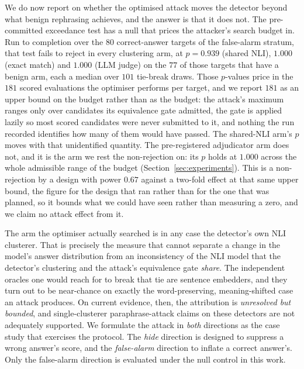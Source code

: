 We do now report on whether the optimised attack moves the detector beyond what benign
rephrasing achieves, and the answer is that it does not. The pre-committed exceedance test
has a null that prices the attacker's search budget in. Run to
completion over the $80$ correct-answer targets of the false-alarm stratum, that test fails
to reject in every clustering arm, at $p{=}0.939$ (shared NLI), $1.000$ (exact match) and
$1.000$ (LLM judge) on the $77$ of those targets that have a benign arm, each a median over
$101$ tie-break draws. Those $p$-values price in the $181$ scored evaluations the optimiser
performs per target, and we report $181$ as an upper bound on the budget rather than as the
budget: the attack's maximum ranges only over candidates its equivalence gate admitted, the
gate is applied lazily so most scored candidates were never submitted to it, and nothing the
run recorded identifies how many of them would have passed. The shared-NLI arm's $p$ moves
with that unidentified quantity. The pre-registered adjudicator arm does not, and it is the
arm we rest the non-rejection on: its $p$ holds at $1.000$ across the whole admissible range
of the budget (Section~\ref{sec:experiments}). This is a
non-rejection by a design with power $0.67$ against a two-fold effect at that same upper
bound, the figure for the design that ran rather than for the one that was planned, so it
bounds what we
could have seen rather than measuring a zero, and we claim no attack effect from it.

The arm the optimiser actually searched is in any case the detector's own NLI clusterer.
That is precisely the measure that cannot separate a change in the model's answer
distribution from an inconsistency of the NLI model that the detector's clustering and the
attack's equivalence gate \emph{share}. The independent oracles one would reach for to break
that tie are sentence embedders, and they turn out to be near-chance on exactly the
word-preserving, meaning-shifted case an attack produces. On current evidence, then, the
attribution is \emph{unresolved but bounded}, and single-clusterer paraphrase-attack claims
on these detectors are not adequately supported. We formulate the attack in \emph{both}
directions as the case study that exercises the protocol. The \emph{hide} direction is
designed to suppress a wrong answer's score, and the \emph{false-alarm} direction to inflate
a correct answer's. Only the false-alarm direction is evaluated under the null control in
this work.

